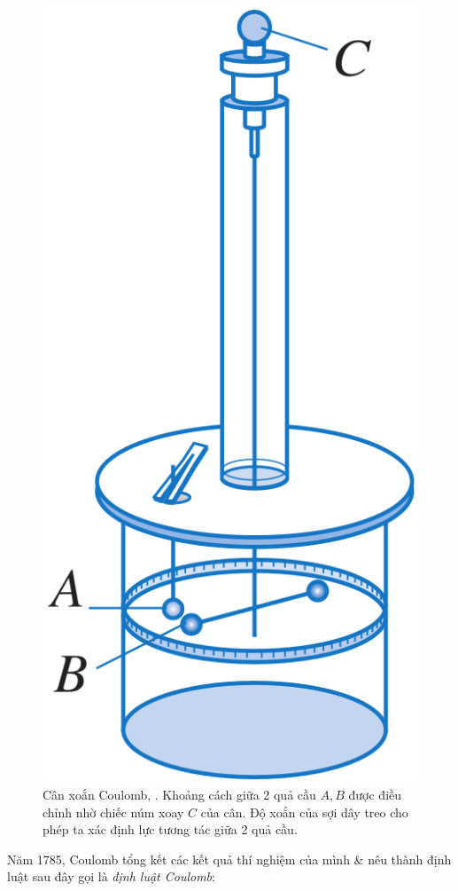 \documentclass[oneside]{book}
\numberwithin{equation}{section}
\begin{document}
\begin{figure}[H]
	\centering
	\includegraphics[scale=0.15]{can_xoan_Coulomb}
	\caption{Cân xoắn Coulomb, \cite[Hình 1.5, p. 7]{SGK_Vat_Ly_11_nang_cao}. Khoảng cách giữa 2 quả cầu $A,B$ được điều chỉnh nhờ chiếc núm xoay $C$ của cân. Độ xoắn của sợi dây treo cho phép ta xác định lực tương tác giữa 2 quả cầu.}
	\label{fig:can_xoan_Coulomb}
\end{figure}
Năm 1785, Coulomb tổng kết các kết quả thí nghiệm của mình \& nêu thành định luật sau đây gọi là \textit{định luật Coulomb}:
\end{document}
